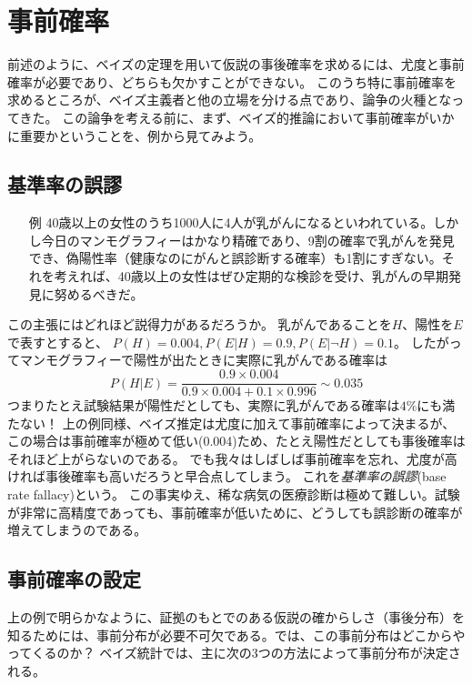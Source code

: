 \documentclass{jsarticle}
\begin{document}
\section{事前確率}
前述のように、ベイズの定理を用いて仮説の事後確率を求めるには、尤度と事前確率が必要であり、どちらも欠かすことができない。
このうち特に事前確率を求めるところが、ベイズ主義者と他の立場を分ける点であり、論争の火種となってきた。
この論争を考える前に、まず、ベイズ的推論において事前確率がいかに重要かということを、例から見てみよう。

\subsection{基準率の誤謬}
\begin{enumerate}
 \item[例] 40歳以上の女性のうち1000人に4人が乳がんになるといわれている。しかし今日のマンモグラフィーはかなり精確であり、9割の確率で乳がんを発見でき、偽陽性率（健康なのにがんと誤診断する確率）も1割にすぎない。それを考えれば、40歳以上の女性はぜひ定期的な検診を受け、乳がんの早期発見に努めるべきだ。
\end{enumerate}
この主張にはどれほど説得力があるだろうか。
乳がんであることを$H$、陽性を$E$で表すとすると、
$P(H)=0.004, P(E|H)=0.9, P(E|\neg H)=0.1$。
したがってマンモグラフィーで陽性が出たときに実際に乳がんである確率は
\[
P(H|E) = \frac{0.9 \times 0.004}{0.9 \times 0.004 + 0.1 \times 0.996} \sim 0.035
\]
つまりたとえ試験結果が陽性だとしても、実際に乳がんである確率は$4\%$にも満たない！
上の例同様、ベイズ推定は尤度に加えて事前確率によって決まるが、この場合は事前確率が極めて低い(0.004)ため、たとえ陽性だとしても事後確率はそれほど上がらないのである。
でも我々はしばしば事前確率を忘れ、尤度が高ければ事後確率も高いだろうと早合点してしまう。
これを\emph{基準率の誤謬}(base rate fallacy)という。
この事実ゆえ、稀な病気の医療診断は極めて難しい。試験が非常に高精度であっても、事前確率が低いために、どうしても誤診断の確率が増えてしまうのである。

\subsection{事前確率の設定}
上の例で明らかなように、証拠のもとでのある仮説の確からしさ（事後分布）を知るためには、事前分布が必要不可欠である。では、この事前分布はどこからやってくるのか？
ベイズ統計では、主に次の3つの方法によって事前分布が決定される。
\vspace{0.5em}
\end{document}
